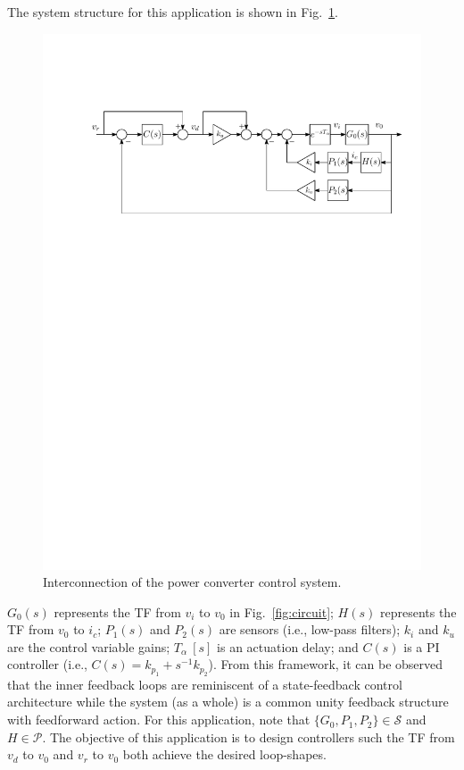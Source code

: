 \documentclass[a4paper, 10pt, conference]{ieeeconf}
\begin{document}
The system structure for this application is shown in Fig.~\ref{fig:damping_loop}. 
\begin{figure}
\centering
\includegraphics[width=\columnwidth]{../pics/damping_loop_full}
\caption{Interconnection of the power converter control system. }
\label{fig:damping_loop}
\end{figure}
$G_0(s)$ represents the TF from $v_i$ to $v_0$ in Fig.~\ref{fig:circuit}; $H(s)$ represents the TF from $v_0$ to $i_c$; $P_1(s)$ and $P_2(s)$ are sensors (i.e., low-pass filters); $k_i$ and $k_u$ are the control variable gains; $T_\alpha \: [s]$ is an actuation delay; and $C(s)$ is a PI controller (i.e., $C(s) = k_{p_1} + s^{-1}k_{p_2}$). From this framework, it can be observed that the inner feedback loops are reminiscent of a state-feedback control architecture while the system (as a whole) is a common unity feedback structure with feedforward action. For this application, note that $\{G_0,P_1,P_2 \} \in \mathscr{S}$ and $H \in \mathscr{P}$. The objective of this application is to design controllers such the TF from $v_d$ to $v_0$ and $v_r$ to $v_0$ both achieve the desired loop-shapes.
\end{document}
